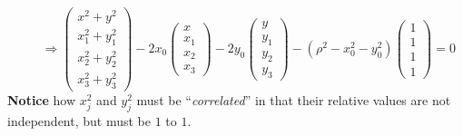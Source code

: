 \documentclass[twoside]{amsart}
\theoremstyle{plain}
\theoremstyle{definition}
\begin{document}
\begin{enumerate}
\[\begin{aligned}
\end{aligned} \quad \, \Longrightarrow \left( \begin{matrix} x^2 + y^2 \\ x_1^2 + y_1^2 \\ x_2^2 + y_2^2 \\ x_3^2 + y_3^2 \end{matrix} \right) -2x_0 \left( \begin{matrix} x \\ x_1 \\ x_2 \\ x_3 \end{matrix} \right) - 2y_0 \left( \begin{matrix} y \\ y_1 \\ y_2 \\ y_3 \end{matrix} \right) - (\rho^2 - x_0^2 - y_0^2) \left( \begin{matrix} 1 \\ 1 \\ 1 \\ 1 \end{matrix} \right) = 0 
\]
\textbf{Notice} how $x_j^2$ and $y_j^2$ must be ``\emph{correlated}'' in that their relative values are not independent, but must be $1$ to $1$.   \\


\end{enumerate}
\end{document}

